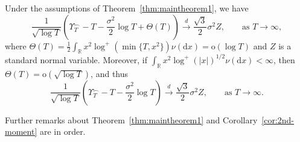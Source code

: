 \documentclass[AHL,Unicode,longabstracts,published]{cedram}
\newcommand\R{\mathbb{R}}
\newcommand\1{\mathds{1}}
\newcommand\D{\mathrm{d}}
\newcommand\oh{\mathrm{o}}
\newcommand\cid{\xrightarrow{d}}
\begin{document}
\begin{coro}\label{cor:2nd-moment}
Under the assumptions of Theorem~\ref{thm:maintheorem1}, we have
\begin{equation}\label{eq:CLT-2}
\frac{1}{\sqrt{\log T}}
\left(\Upsilon_T^{\frown} -T-\frac{\sigma^2}{2}\log T +\Theta(T)\right)
\cid \frac{\sqrt{3}}{2}\sigma^2 Z,
\qquad\text{as }T\to\infty,
\end{equation}
where $\Theta(T)=\tfrac{1}{2}\int_\R x^2\log^+(\min\{T,x^2\})\nu(\D x)=\oh(\log T)$ and $Z$ is a standard normal variable. Moreover, if $\int_\R x^2\log^+(|x|)^{1/2}\nu(\D x)<\infty$, then $\Theta(T)=\oh(\sqrt{\log T})$, and thus
\begin{equation}\label{eq:CLT-3}
\frac{1}{\sqrt{\log T}}
\left(\Upsilon_T^{\frown} -T-\frac{\sigma^2}{2}\log T\right)
\cid \frac{\sqrt{3}}{2}\sigma^2 Z,
\qquad\text{as }T\to\infty.
\end{equation}
\end{coro}

Further remarks about Theorem~\ref{thm:maintheorem1} and Corollary~\ref{cor:2nd-moment} are in order.
\end{document}

